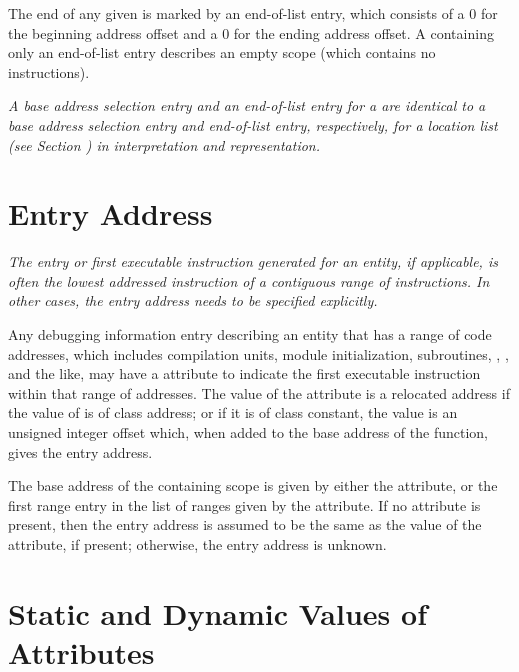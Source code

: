 The end of any given  is marked by an 
end-of-list entry, 
which consists of a 0 for the beginning address
offset and a 0 for the ending address offset. 
A 
containing only an end-of-list entry describes an empty scope
(which contains no instructions).

\textit{A base address selection entry and an 
end-of-list entry for
a  
are identical to a base address selection entry
and end-of-list entry, respectively, for a location list
(see Section ) 
in interpretation and representation.}



\section{Entry Address}
\label{chap:entryaddress}
\textit{The entry or first executable instruction generated
for an entity, if applicable, is often the lowest addressed
instruction of a contiguous range of instructions. In other
cases, the entry address needs to be specified explicitly.}

Any debugging information entry describing an entity that has
a range of code addresses, which includes compilation units,
module initialization, subroutines, 
,
,
and the like, may have a \DWATentrypcNAME{} attribute to
indicate the first executable instruction within that 
range\hypertarget{chap:entryaddressofscope}{}
of addresses. The value of the \DWATentrypcNAME{} attribute is a
relocated address if the
value of \DWATentrypcNAME{} is of class address; or if it is of class
constant, the value is an unsigned integer offset which, when
added to the base address of the function, gives the entry
address. 

The base address of the containing scope is given by either the
\DWATlowpc{} attribute, or the first range entry in the list of
ranges given by the \DWATranges{} attribute. 
If no \DWATentrypcNAME{} attribute is present,
then the entry address is assumed to be the same as the
value of the \DWATlowpc{} attribute, if present; otherwise,
the entry address is unknown.

\section{Static and Dynamic Values of Attributes}
\label{chap:staticanddynamicvaluesofattributes}

